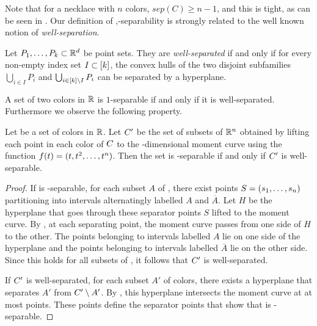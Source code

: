 \documentclass[a4paper,UKenglish,cleveref, thm-restate]{lipics-v2021}
\begin{document}
Note that for a necklace with $n$ colors, $sep(C)\geq n-1$, and this is tight, as can be seen in .
Our definition of \sep-separability is strongly related to the well known notion of \emph{well-separation}.

\begin{definition}
Let $P_1, \dots, P_\sep \subset \Reals^d$ be point sets. They are \emph{well-separated} if and only if for every non-empty index set $I \subset [\sep]$, the convex hulls of the two disjoint subfamilies  $\bigcup_{i \in I} P_i$ and $\bigcup_{i \in [\sep]\setminus I} P_i$ can be separated by a hyperplane.
\end{definition}

A set of two colors in $\mathbb{R}$ is $1$-separable if and only if it is well-separated.
Furthermore we observe the following property.

\begin{lemma}
\label{lem:dSeparable<=>wellSeparable}
Let \Colors be a set of \dimension colors in $\mathbb{R}$. Let $\Colors'$ be the set of subsets of $\Reals^\dimension$ obtained by lifting each point in each color of $\Colors$ to the \dimension-dimensional moment curve using the function $f(t)=(t,t^2,\ldots,t^\dimension)$.
Then the set \Colors is \dimension-separable if and only if $\Colors'$ is well-separable.
\end{lemma}

\begin{proof}

If \Colors is \dimension-separable, for each subset $A$ of \Colors, there exist \dimension points $S=(s_1, \dots, s_\dimension)$ partitioning \Colors into intervals alternatingly labelled $A$ and $\overline{A}$.
Let $H$ be the hyperplane that goes through these separator points $S$ lifted to the moment curve.
By \cite[Lemma~5.4.2]{matousek2002lectures}, at each separating point, the moment curve passes from one side of $H$ to the other.
The points belonging to intervals labelled $A$ lie on one side of the hyperplane and the points belonging to intervals labelled $\overline{A}$ lie on the other side.
Since this holds for all subsets of \Colors, it follows that $\Colors'$ is well-separated.

If $\Colors'$ is well-separated, for each subset $A'$ of colors, there exists a hyperplane that separates $A'$ from $\Colors' \setminus A'$.
By \cite[Lemma~5.4.2]{matousek2002lectures}, this hyperplane intersects the moment curve at at most \dimension points. These points define the separator points that show that \Colors is \dimension-separable.
\end{proof}
\end{document}
